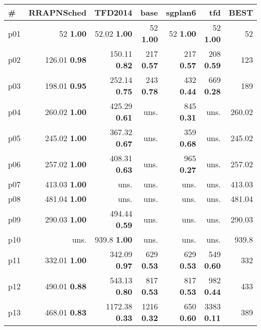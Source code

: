 \begin{tabular}{|l|rrrrr|r|}
\hline
\textbf{\#} & \textbf{RRAPNSched} & \textbf{TFD2014} & \textbf{base} & \textbf{sgplan6} & \textbf{tfd} & \textbf{BEST}\\
\hline
p01 & {\footnotesize 52} \textbf{1.00} & {\footnotesize 52.02} \textbf{1.00} & {\footnotesize 52} \textbf{1.00} & {\footnotesize 52} \textbf{1.00} & {\footnotesize 52} \textbf{1.00} & 52\\
p02 & {\footnotesize 126.01} \textbf{0.98} & {\footnotesize 150.11} \textbf{0.82} & {\footnotesize 217} \textbf{0.57} & {\footnotesize 217} \textbf{0.57} & {\footnotesize 208} \textbf{0.59} & 123\\
p03 & {\footnotesize 198.01} \textbf{0.95} & {\footnotesize 252.14} \textbf{0.75} & {\footnotesize 243} \textbf{0.78} & {\footnotesize 432} \textbf{0.44} & {\footnotesize 669} \textbf{0.28} & 189\\
p04 & {\footnotesize 260.02} \textbf{1.00} & {\footnotesize 425.29} \textbf{0.61} & uns. & {\footnotesize 845} \textbf{0.31} & uns. & 260.02\\
p05 & {\footnotesize 245.02} \textbf{1.00} & {\footnotesize 367.32} \textbf{0.67} & uns. & {\footnotesize 359} \textbf{0.68} & uns. & 245.02\\
p06 & {\footnotesize 257.02} \textbf{1.00} & {\footnotesize 408.31} \textbf{0.63} & uns. & {\footnotesize 965} \textbf{0.27} & uns. & 257.02\\
p07 & {\footnotesize 413.03} \textbf{1.00} & uns. & uns. & uns. & uns. & 413.03\\
p08 & {\footnotesize 481.04} \textbf{1.00} & uns. & uns. & uns. & uns. & 481.04\\
p09 & {\footnotesize 290.03} \textbf{1.00} & {\footnotesize 494.44} \textbf{0.59} & uns. & uns. & uns. & 290.03\\
p10 & uns. & {\footnotesize 939.8} \textbf{1.00} & uns. & uns. & uns. & 939.8\\
p11 & {\footnotesize 332.01} \textbf{1.00} & {\footnotesize 342.09} \textbf{0.97} & {\footnotesize 629} \textbf{0.53} & {\footnotesize 629} \textbf{0.53} & {\footnotesize 549} \textbf{0.60} & 332\\
p12 & {\footnotesize 490.01} \textbf{0.88} & {\footnotesize 543.13} \textbf{0.80} & {\footnotesize 817} \textbf{0.53} & {\footnotesize 817} \textbf{0.53} & {\footnotesize 982} \textbf{0.44} & 433\\
p13 & {\footnotesize 468.01} \textbf{0.83} & {\footnotesize 1172.38} \textbf{0.33} & {\footnotesize 1216} \textbf{0.32} & {\footnotesize 650} \textbf{0.60} & {\footnotesize 3383} \textbf{0.11} & 389\\

\end{tabular}
